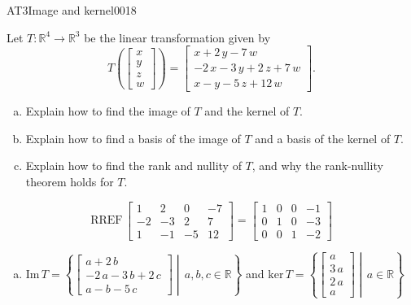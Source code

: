 \begin{exercise}{AT3}{Image and kernel}{0018} 
\begin{exerciseStatement} 

 Let \(T:\mathbb{R}^4 \to \mathbb{R}^3\) be the linear transformation given by \[T\left( \left[\begin{array}{c}
x \\
y \\
z \\
{w}
\end{array}\right] \right) = \left[\begin{array}{c}
x + 2 \, y - 7 \, {w} \\
-2 \, x - 3 \, y + 2 \, z + 7 \, {w} \\
x - y - 5 \, z + 12 \, {w}
\end{array}\right].\] 

 

\begin{enumerate}[(a)]
\item Explain how to find the image of \(T\) and the kernel of \(T\).
\item Explain how to find a basis of the image of \(T\) and a basis of the kernel of \(T\).
\item Explain how to find the rank and nullity of \(T\), and why the rank-nullity theorem holds for \(T\).
\end{enumerate}

     \end{exerciseStatement}
 \begin{exerciseAnswer} 

\[\mathrm{RREF}\,\left[\begin{array}{cccc}
1 & 2 & 0 & -7 \\
-2 & -3 & 2 & 7 \\
1 & -1 & -5 & 12
\end{array}\right]=\left[\begin{array}{cccc}
1 & 0 & 0 & -1 \\
0 & 1 & 0 & -3 \\
0 & 0 & 1 & -2
\end{array}\right]\]

 

\begin{enumerate}[(a)]
\item  

 \(\mathrm{Im}\,T =  \left\{ \left[\begin{array}{c}
a + 2 \, b \\
-2 \, a - 3 \, b + 2 \, c \\
a - b - 5 \, c
\end{array}\right] \middle|\,a,b,c\in\mathbb{R}\right\}\) and \(\mathrm{ker}\,T = \left\{ \left[\begin{array}{c}
a \\
3 \, a \\
2 \, a \\
a
\end{array}\right] \middle|\,a\in\mathbb{R}\right\}\) 


\end{enumerate}
\end{exerciseAnswer}
\end{exercise}
